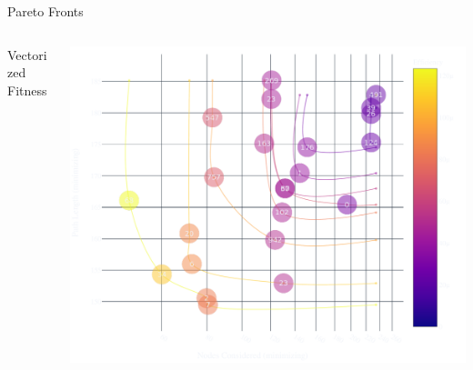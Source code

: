 \documentclass[aspectratio=169]{beamer}
\begin{document}
\begin{frame}{{Pareto Fronts}}
  \begin{columns}[T]
      \begin{column}{.4\linewidth}
          \begin{vfilleditems}
              \item {\Large Vectorized Fitness}
              \vspace{1em}
          \end{vfilleditems}
      \end{column}
      \begin{column}{.6\linewidth}
      \includegraphics[width=0.9\linewidth, keepaspectratio]{figures/total_pareto_overview.pdf}
      \end{column}
  \end{columns}
\end{frame}
\end{document}
